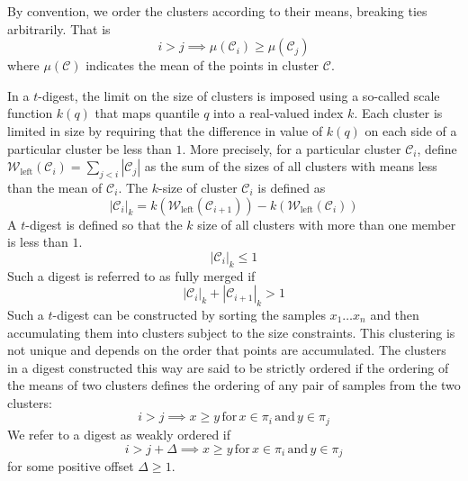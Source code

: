 \documentclass{vldb}
\begin{document}
By convention, we order the clusters according to their means, breaking ties arbitrarily. That is
\begin{equation*}
i > j \implies \mu(\mathcal C_i) \ge \mu(\mathcal C_j)
\end{equation*}
where $\mu(\mathcal C)$ indicates the mean of the points in cluster $\mathcal C$.

In a $t$-digest, the limit on the size of clusters is imposed using a so-called scale function $k(q)$ that maps quantile $q$ into a real-valued index $k$. Each cluster is limited in size by requiring that the difference in value of $k(q)$ on each side of a particular cluster be less than $1$. More precisely, for a particular cluster $\mathcal C_i$, define $\mathcal W_{\mathrm {left}}(\mathcal C_i) = \sum_{j<i} |\mathcal C_j|$ as the sum of the sizes of all clusters with means less than the mean of $\mathcal C_i$. The $k$-size of cluster $\mathcal C_i$ is defined as
\begin{equation}
{|\mathcal C_i |}_k = k\left(\mathcal W_{\mathrm{left}} (\mathcal C_{i+1}) \right) - k\left(\mathcal W_{\mathrm{left}} (\mathcal C_{i}) \right) 
\end{equation}
A $t$-digest is defined so that the $k$ size of all clusters with more than one member is less than $1$. \begin{equation}\label{eq:size-limit}
{|\mathcal C_i |}_k \le 1
\end{equation}
Such a digest is referred to as fully merged if
\begin{equation}
{|\mathcal C_i |}_k+{|\mathcal C_{i+1} |}_k > 1
\end{equation}
Such a $t$-digest can be constructed by sorting  the samples $x_1 \ldots x_n$ and then accumulating them into clusters subject to the size constraints. This clustering is not unique and depends on the order that  points are accumulated. The clusters in a digest constructed this way are said to be strictly ordered if the ordering of the means of two clusters defines the ordering of any pair of samples from the two clusters:
\begin{equation}\label{eq:weak-ordering}
 i > j \implies x \ge y \mathrm{\,for\,} x \in \pi_i \mathrm{\,and\,} y \in \pi_j
 \end{equation}
We refer to a digest as weakly ordered if
\begin{equation}\label{eq:strong-ordering}
 i > j+\Delta \implies x \ge y \mathrm{\,for\,} x \in \pi_i \mathrm{\,and\,} y \in \pi_j
 \end{equation}
for some positive offset $\Delta\ge 1$.
\end{document}
